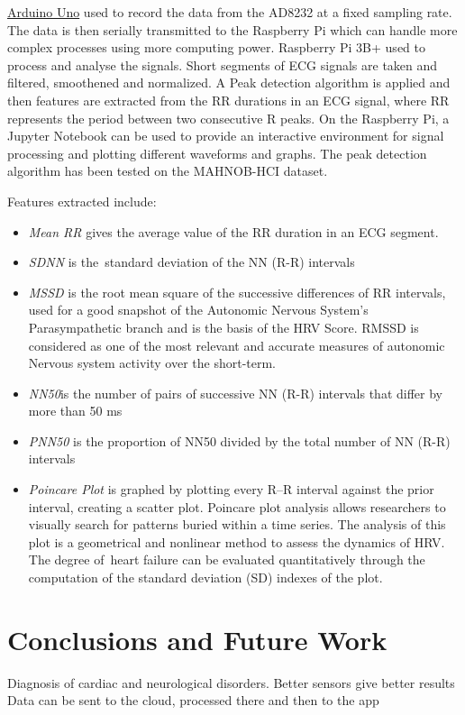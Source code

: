 \documentclass[11pt]{article}
\theoremstyle{definition}
\begin{document}
  \underline{Arduino Uno} used to record the data from the AD8232 at a fixed sampling rate.
  The data is then serially transmitted to the Raspberry Pi which can handle more complex processes using more computing power.
  Raspberry Pi 3B+ used to process and analyse the signals.
  Short segments of ECG signals are taken and filtered, smoothened and normalized.
  A Peak detection algorithm is applied and then features are extracted from the RR durations in an ECG signal, where RR represents the period between two consecutive R peaks.
  On the Raspberry Pi, a Jupyter Notebook can be used to provide an interactive environment for signal processing and plotting different waveforms and graphs.
  The peak detection algorithm has been tested on the MAHNOB-HCI\cite{lichtenauer2011mahnob} dataset.

  Features extracted include:
  \begin{itemize}[topsep=1pt]
    \item[] \textit{Mean RR} gives the average value of the RR duration in an ECG segment.
    \item[] \textit{SDNN} is the standard deviation of the NN (R-R) intervals
    \item[] \textit{MSSD} is the root mean square of the successive differences of RR intervals, used for a good snapshot of the Autonomic Nervous System’s Parasympathetic branch and is the basis of the HRV Score.  RMSSD is considered as one of the most relevant and accurate measures of autonomic Nervous system activity over the short-term.
    \item[] \textit{NN50}is the number of pairs of successive NN (R-R) intervals that differ by more than 50 ms
    \item[] \textit{PNN50} is the proportion of NN50 divided by the total number of NN (R-R) intervals
    \item[] \textit{Poincare Plot} is graphed by plotting every R–R interval against the prior interval, creating a scatter plot.
    Poincare plot analysis allows researchers to visually search for patterns buried within a time series.
    The analysis of this plot is a geometrical and nonlinear method to assess the dynamics of HRV.
    The degree of heart failure can be evaluated quantitatively through the computation of the standard deviation (SD) indexes of the plot\cite{hsu2012poincare}.
  \end{itemize}


  \section{Conclusions and Future Work}

  Diagnosis of cardiac and neurological disorders.
  Better sensors give better results
  Data can be sent to the cloud, processed there and then to the app


  
  
\end{document}

